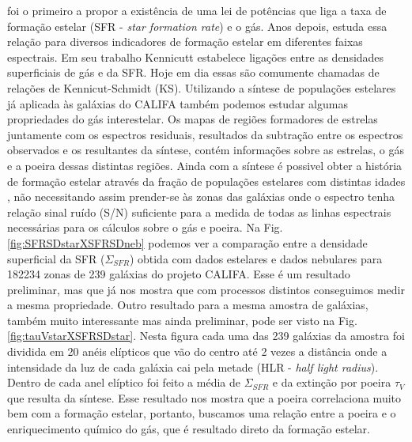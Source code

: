 \documentclass[a4paper,12pt]{article}
\begin{document}
\citet{Schmidt.1959a} foi o primeiro a propor a existência de uma lei de potências que liga a taxa
de formação estelar (SFR - {\em star formation rate}) e o gás. Anos depois, \citet{Kennicutt.1998a}
estuda essa relação para diversos indicadores de formação estelar em diferentes faixas espectrais.
Em seu trabalho Kennicutt estabelece ligações entre as densidades superficiais de gás e da SFR. Hoje
em dia essas são comumente chamadas de relações de Kennicut-Schmidt (KS). Utilizando a síntese de
populações estelares já aplicada às galáxias do CALIFA também podemos estudar algumas propriedades
do gás interestelar. Os mapas de regiões formadores de estrelas juntamente com os espectros
residuais, resultados da subtração entre os espectros observados e os resultantes da síntese, contém
informações sobre as estrelas, o gás e a poeira dessas distintas regiões. Ainda com a síntese é
possivel obter a história de formação estelar através da fração de populações estelares com
distintas idades \citep{Asari.etal.2007a}, não necessitando assim prender-se às zonas das galáxias
onde o espectro tenha relação sinal ruído (S/N) suficiente para a medida de todas as linhas
espectrais necessárias para os cálculos sobre o gás e poeira. Na Fig. \ref{fig:SFRSDstarXSFRSDneb}
podemos ver a comparação entre a densidade superficial da SFR ($\Sigma_{SFR}$) obtida com dados
estelares e dados nebulares para 182234 zonas de 239 galáxias do projeto CALIFA. Esse é um resultado
preliminar, mas que já nos mostra que com processos distintos conseguimos medir a mesma propriedade.
Outro resultado para a mesma amostra de galáxias, também muito interessante mas ainda preliminar,
pode ser visto na Fig.\ref{fig:tauVstarXSFRSDstar}. Nesta figura cada uma das 239 galáxias da
amostra foi dividida em 20 anéis elípticos que vão do centro até 2 vezes a distância onde a
intensidade da luz de cada galáxia cai pela metade (HLR - {\em half light radius}). Dentro de cada
anel elíptico foi feito a média de $\Sigma_{SFR}$ e da extinção por poeira $\tau_V$ que resulta da
síntese. Esse resultado nos mostra que a poeira correlaciona muito bem com a formação estelar,
portanto, buscamos uma relação entre a poeira e o enriquecimento químico do gás, que é resultado
direto da formação estelar.
\end{document}
